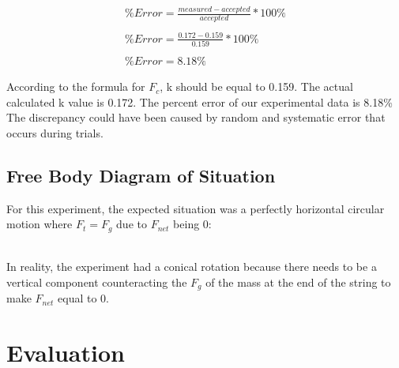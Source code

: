 \documentclass{article}[12pt]
\begin{document}
\begin{eqnarray*}
\%Error=\frac{measured-accepted}{accepted}*100\%\\\\
\%Error=\frac{0.172-0.159}{0.159}*100\%\\\\
\%Error=8.18\%
\end{eqnarray*}


According to the formula for $F_c$, k should be equal to 0.159. The actual calculated k value is 0.172. The percent error of our experimental data is 8.18\% The discrepancy could have been caused by random and systematic error that occurs during trials.

\subsection{Free Body Diagram of Situation}
For this experiment, the expected situation was a perfectly horizontal circular motion where $F_t=F_g$ due to $F_{net}$ being 0:\\
\\
In reality, the experiment had a conical rotation because there needs to be a vertical component counteracting the $F_g$ of the mass at the end of the string to make $F_{net}$ equal to 0.\\

\section*{Evaluation}
\end{document}
